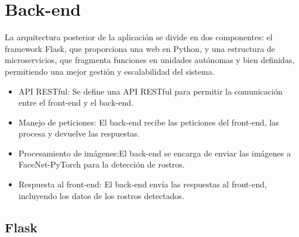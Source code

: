 \documentclass[12pt]{article}
\begin{document}
\section{Back-end}

La arquitectura posterior de la aplicación se divide en dos componentes: el framework Flask, que proporciona una web en Python, y una estructura de microservicios, que fragmenta funciones en unidades autónomas y bien definidas, permitiendo una mejor gestión y escalabilidad del sistema.
\begin{itemize}
    \item API RESTful: Se define una API RESTful para permitir la comunicación entre el front-end y el back-end.
    \item Manejo de peticiones: El back-end recibe las peticiones del front-end, las procesa y devuelve las respuestas.
    \item Procesamiento de imágenes:El back-end se encarga de enviar las imágenes a FaceNet-PyTorch para la detección de rostros.
    \item Respuesta al front-end: El back-end envía las respuestas al front-end, incluyendo los datos de los rostros detectados.
\end{itemize}

\subsection{Flask}
\end{document}
